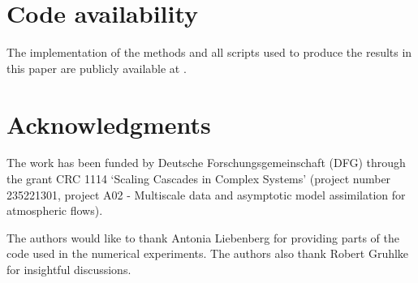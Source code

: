 \documentclass[a4paper]{article}
\numberwithin{equation}{section}
\begin{document}

\section*{Code availability}
The implementation of the methods and all scripts used to produce the results in this paper are publicly available at \cite{Chakraborty25}.

\section*{Acknowledgments}
The work has been funded by Deutsche Forschungsgemeinschaft (DFG) through
the grant CRC 1114 ‘Scaling Cascades in Complex Systems’ (project number 235221301,
project A02 - Multiscale data and asymptotic model assimilation for atmospheric flows).

The authors would like to thank Antonia Liebenberg for providing parts of the code used in the numerical experiments. The authors also thank Robert Gruhlke for insightful discussions.







\end{document}
